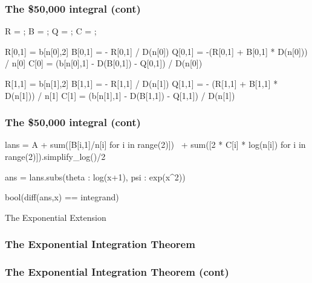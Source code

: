 \documentclass[aspectratio=169,dvipsnames]{beamer}
\begin{document}
\begin{frame}[fragile]
\frametitle{The \$50,000 integral (cont)}

\begin{sagecode}
R = {};
B = {};
Q = {};
C = {};
\end{sagecode}

\begin{sageblock}
R[0,1] = b[n[0],2]
B[0,1] = - R[0,1] / D(n[0])
Q[0,1] = -(R[0,1] + B[0,1] * D(n[0])) / n[0]
C[0] = (b[n[0],1] - D(B[0,1]) - Q[0,1]) / D(n[0])
\end{sageblock}

\begin{sageblock}
R[1,1] = b[n[1],2]
B[1,1] = - R[1,1] / D(n[1])
Q[1,1] = - (R[1,1] + B[1,1] * D(n[1])) / n[1]
C[1] = (b[n[1],1] - D(B[1,1]) - Q[1,1]) / D(n[1])
\end{sageblock}

\end{frame}

\begin{frame}[fragile]
\frametitle{The \$50,000 integral (cont)}

\begin{sageblock}
lans = A + sum([B[i,1]/n[i] for i in range(2)]) \
  + sum([2 * C[i] * log(n[i]) for i in range(2)]).simplify_log()/2
\end{sageblock}

\begin{sageblock}
ans = lans.subs({theta : log(x+1), psi : exp(x^2)})
\end{sageblock}

\begin{sageblock}
bool(diff(ans,x) == integrand)
\end{sageblock}

\end{frame}

\begin{frame}
\Huge
\centerline{The Exponential Extension}
\end{frame}

\begin{frame}
\frametitle{The Exponential Integration Theorem}
\small
{}
\end{frame}

\begin{frame}
\frametitle{The Exponential Integration Theorem (cont)}
\tiny
{}
\end{frame}
\end{document}
